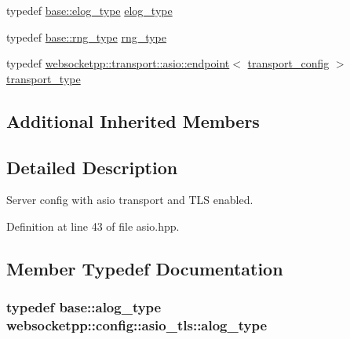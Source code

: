 \begin{DoxyCompactItemize}
\item 
typedef \hyperlink{structwebsocketpp_1_1config_1_1core_ac037ffb73b675a6251f3b86433b4eb17}{base\+::elog\+\_\+type} \hyperlink{structwebsocketpp_1_1config_1_1asio__tls_a81b08cb436d7666730391fc9f3c73de7}{elog\+\_\+type}
\item 
typedef \hyperlink{structwebsocketpp_1_1config_1_1core_a245db33d05f7994d221db66f506ab8c6}{base\+::rng\+\_\+type} \hyperlink{structwebsocketpp_1_1config_1_1asio__tls_a4d32d1651cb937c392c4eed71034752e}{rng\+\_\+type}
\item 
typedef \hyperlink{classwebsocketpp_1_1transport_1_1asio_1_1endpoint}{websocketpp\+::transport\+::asio\+::endpoint}$<$ \hyperlink{structwebsocketpp_1_1config_1_1asio__tls_1_1transport__config}{transport\+\_\+config} $>$ \hyperlink{structwebsocketpp_1_1config_1_1asio__tls_ad261981514a31011420d9191ff9b80a8}{transport\+\_\+type}
\end{DoxyCompactItemize}
\subsection*{Additional Inherited Members}


\subsection{Detailed Description}
Server config with asio transport and T\+L\+S enabled. 

Definition at line 43 of file asio.\+hpp.



\subsection{Member Typedef Documentation}
\hypertarget{structwebsocketpp_1_1config_1_1asio__tls_a27fcf6498be1a6ab0e81ea117b5a9903}{}
\subsubsection[{alog\+\_\+type}]{\setlength{\rightskip}{0pt plus 5cm}typedef {\bf base\+::alog\+\_\+type} {\bf websocketpp\+::config\+::asio\+\_\+tls\+::alog\+\_\+type}}\label{structwebsocketpp_1_1config_1_1asio__tls_a27fcf6498be1a6ab0e81ea117b5a9903}


